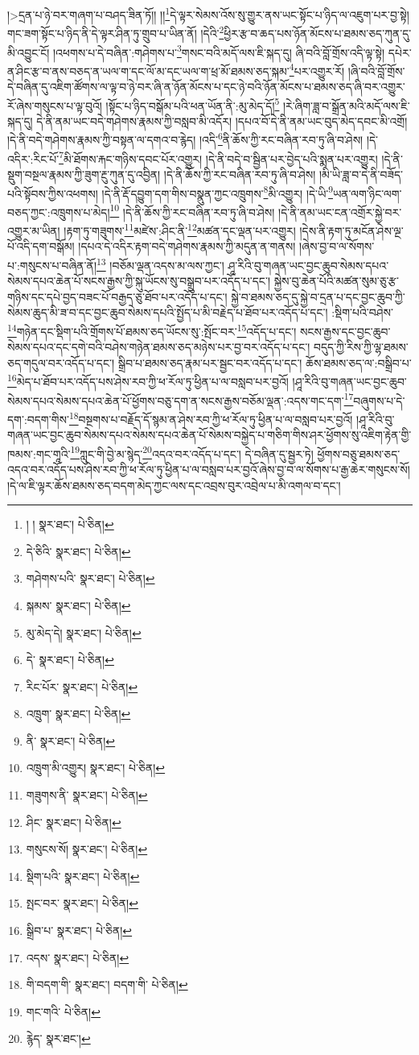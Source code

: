 །>དྲན་པ་ཉེ་བར་གཞག་པ་བཤད་ཟིན་ཏོ།། །།\footnote{། །  སྣར་ཐང་།  པེ་ཅིན། }དེ་ལྟར་སེམས་འོས་སུ་གྱུར་ནས་ཡང་སྟོང་པ་ཉིད་ལ་འཇུག་པར་བྱ་སྟེ། གང་ཟག་སྟོང་པ་ཉིད་ནི་དེ་ལྟར་ཤིན་ཏུ་གྲུབ་པ་ཡིན་ནོ། །དེའི་\footnote{དེ་ཅིའི་  སྣར་ཐང་།  པེ་ཅིན། }ཕྱིར་རྩ་བ་ཆད་པས་ཉོན་མོངས་པ་ཐམས་ཅད་ཀུན་དུ་མི་འབྱུང་ངོ། །འཕགས་པ་དེ་བཞིན་:གཤེགས་པ་\footnote{གཤེགས་པའི་  སྣར་ཐང་།  པེ་ཅིན། }གསང་བའི་མདོ་ལས་ཇི་སྐད་དུ། ཞི་བའི་བློ་གྲོས་འདི་ལྟ་སྟེ། དཔེར་ན་ཤིང་རྩ་བ་ནས་བཅད་ན་ཡལ་ག་དང་ལོ་མ་དང་ཡལ་ག་ཕྲ་མོ་ཐམས་ཅད་སྐམ་\footnote{སྐམས་  སྣར་ཐང་།  པེ་ཅིན། }པར་འགྱུར་རོ། །ཞི་བའི་བློ་གྲོས་དེ་བཞིན་དུ་འཇིག་ཚོགས་ལ་ལྟ་བ་ཉེ་བར་ཞི་ན་ཉོན་མོངས་པ་དང་ཉེ་བའི་ཉོན་མོངས་པ་ཐམས་ཅད་ཞི་བར་འགྱུར་རོ་ཞེས་གསུངས་པ་ལྟ་བུའོ། །སྟོང་པ་ཉིད་བསྒོམ་པའི་ཕན་ཡོན་ནི་:མུ་མེད་དོ།\footnote{མུ་མེད་དེ།  སྣར་ཐང་།  པེ་ཅིན། } །རེ་ཞིག་ཟླ་བ་སྒྲོན་མའི་མདོ་ལས་ཇི་སྐད་དུ། དེ་ནི་ནམ་ཡང་བདེ་གཤེགས་རྣམས་ཀྱི་བསླབ་མི་འདོར། །དཔའ་བོ་དེ་ནི་ནམ་ཡང་བུད་མེད་དབང་མི་འགྲོ། །དེ་ནི་བདེ་གཤེགས་རྣམས་ཀྱི་བསྟན་ལ་དགའ་བ་རྙེད། །འདི་\footnote{དེ་  སྣར་ཐང་།  པེ་ཅིན། }ནི་ཆོས་ཀྱི་རང་བཞིན་རབ་ཏུ་ཞི་བ་ཤེས། །དེ་འདིར་:རིང་པོ་\footnote{རིང་པོར་  སྣར་ཐང་།  པེ་ཅིན། }མི་ཐོགས་རྐང་གཉིས་དབང་པོར་འགྱུར། །དེ་ནི་བདེ་བ་སྦྱིན་པར་བྱེད་པའི་སྨན་པར་འགྱུར། །དེ་ནི་སྡུག་བསྔལ་རྣམས་ཀྱི་ཟུག་རྔུ་ཀུན་དུ་འབྱིན། །དེ་ནི་ཆོས་ཀྱི་རང་བཞིན་རབ་ཏུ་ཞི་བ་ཤེས། །མི་ཡི་ཟླ་བ་དེ་ནི་བཟོད་པའི་སྟོབས་ཀྱིས་འཕགས། །དེ་ནི་རྡོ་དབྱུག་དག་གིས་བསྣུན་ཀྱང་འཁྲུགས་\footnote{འཁྲུག་  སྣར་ཐང་།  པེ་ཅིན། }མི་འགྱུར། །དེ་ཡི་\footnote{ནི་  སྣར་ཐང་།  པེ་ཅིན། }ཡན་ལག་ཉིང་ལག་བཅད་ཀྱང་:འཁྲུགས་པ་མེད།\footnote{འཁྲུག་མི་འགྱུར།  སྣར་ཐང་།  པེ་ཅིན། } །དེ་ནི་ཆོས་ཀྱི་རང་བཞིན་རབ་ཏུ་ཞི་བ་ཤེས། །དེ་ནི་ནམ་ཡང་ངན་འགྲོར་སྐྱེ་བར་འགྱུར་མ་ཡིན། །རྟག་ཏུ་གཟུགས་\footnote{གཟུགས་ནི་  སྣར་ཐང་།  པེ་ཅིན། }མཛེས་:ཤིང་ནི་\footnote{ཤིང་  སྣར་ཐང་།  པེ་ཅིན། }མཚན་དང་ལྡན་པར་འགྱུར། །དེས་ནི་རྟག་ཏུ་མངོན་ཤེས་ལྔ་པོ་འདི་དག་བསྒོམ། །དཔའ་དེ་འདིར་རྟག་བདེ་གཤེགས་རྣམས་ཀྱི་མདུན་ན་གནས། །ཞེས་བྱ་བ་ལ་སོགས་པ་:གསུངས་པ་བཞིན་ནོ།\footnote{གསུངས་སོ།  སྣར་ཐང་།  པེ་ཅིན། } །བཅོམ་ལྡན་འདས་མ་ལས་ཀྱང་། ཤཱ་རིའི་བུ་གཞན་ཡང་བྱང་ཆུབ་སེམས་དཔའ་སེམས་དཔའ་ཆེན་པོ་སངས་རྒྱས་ཀྱི་སྐུ་ཡོངས་སུ་བསྒྲུབ་པར་འདོད་པ་དང་། སྐྱེས་བུ་ཆེན་པོའི་མཚན་སུམ་ཅུ་རྩ་གཉིས་དང་དཔེ་བྱད་བཟང་པོ་བརྒྱད་ཅུ་ཐོབ་པར་འདོད་པ་དང་། སྐྱེ་བ་ཐམས་ཅད་དུ་སྐྱེ་བ་དྲན་པ་དང་བྱང་ཆུབ་ཀྱི་སེམས་ཆུད་མི་ཟ་བ་དང་བྱང་ཆུབ་སེམས་དཔའི་སྤྱོད་པ་མི་བརྗེད་པ་ཐོབ་པར་འདོད་པ་དང་། :སྡིག་པའི་བཤེས་\footnote{སྡིག་པའི་  སྣར་ཐང་།  པེ་ཅིན། }གཉེན་དང་སྡིག་པའི་གྲོགས་པོ་ཐམས་ཅད་ཡོངས་སུ་:སྤོང་བར་\footnote{སྤང་བར་  སྣར་ཐང་།  པེ་ཅིན། }འདོད་པ་དང་། སངས་རྒྱས་དང་བྱང་ཆུབ་སེམས་དཔའ་དང་དགེ་བའི་བཤེས་གཉེན་ཐམས་ཅད་མཉེས་པར་བྱ་བར་འདོད་པ་དང་། བདུད་ཀྱི་རིས་ཀྱི་ལྷ་ཐམས་ཅད་གདུལ་བར་འདོད་པ་དང་། སྒྲིབ་པ་ཐམས་ཅད་རྣམ་པར་སྦྱང་བར་འདོད་པ་དང་། ཆོས་ཐམས་ཅད་ལ་:བསྒྲིབ་པ་\footnote{སྒྲིབ་པ་  སྣར་ཐང་།  པེ་ཅིན། }མེད་པ་ཐོབ་པར་འདོད་པས་ཤེས་རབ་ཀྱི་ཕ་རོལ་ཏུ་ཕྱིན་པ་ལ་བསླབ་པར་བྱའོ། །ཤཱ་རིའི་བུ་གཞན་ཡང་བྱང་ཆུབ་སེམས་དཔའ་སེམས་དཔའ་ཆེན་པོ་ཕྱོགས་བཅུ་དག་ན་སངས་རྒྱས་བཅོམ་ལྡན་:འདས་གང་དག་\footnote{འདས་  སྣར་ཐང་།  པེ་ཅིན། }བཞུགས་པ་དེ་དག་:བདག་གིས་\footnote{གི་བདག་གི་  སྣར་ཐང་། བདག་གི་  པེ་ཅིན། }བསྔགས་པ་བརྗོད་དོ་སྙམ་ན་ཤེས་རབ་ཀྱི་ཕ་རོལ་ཏུ་ཕྱིན་པ་ལ་བསླབ་པར་བྱའོ། །ཤཱ་རིའི་བུ་གཞན་ཡང་བྱང་ཆུབ་སེམས་དཔའ་སེམས་དཔའ་ཆེན་པོ་སེམས་བསྐྱེད་པ་གཅིག་གིས་ཤར་ཕྱོགས་སུ་འཇིག་རྟེན་གྱི་ཁམས་:གང་གཱའི་\footnote{གང་གའི་  པེ་ཅིན། }ཀླུང་གི་བྱེ་མ་སྙེད་\footnote{རྙེད་  སྣར་ཐང་། }འདའ་བར་འདོད་པ་དང་། དེ་བཞིན་དུ་སྦྱར་ཏེ། ཕྱོགས་བཅུ་ཐམས་ཅད་འདའ་བར་འདོད་པས་ཤེས་རབ་ཀྱི་ཕ་རོལ་ཏུ་ཕྱིན་པ་ལ་བསླབ་པར་བྱའོ་ཞེས་བྱ་བ་ལ་སོགས་པ་རྒྱ་ཆེར་གསུངས་སོ། །དེ་ལ་ཇི་ལྟར་ཆོས་ཐམས་ཅད་བདག་མེད་ཀྱང་ལས་དང་འབྲས་བུར་འབྲེལ་པ་མི་འགལ་བ་དང་། 